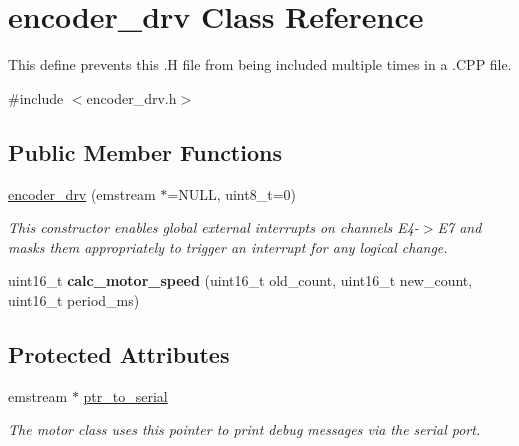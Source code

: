 \hypertarget{classencoder__drv}{\section{encoder\-\_\-drv Class Reference}
\label{classencoder__drv}
}


This define prevents this .H file from being included multiple times in a .C\-P\-P file.  




{\ttfamily \#include $<$encoder\-\_\-drv.\-h$>$}

\subsection*{Public Member Functions}
\begin{DoxyCompactItemize}
\item 
\hyperlink{classencoder__drv_a25af67f4725b47983ceb8ce4edf3296a}{encoder\-\_\-drv} (emstream $\ast$=N\-U\-L\-L, uint8\-\_\-t=0)
\begin{DoxyCompactList}\small\item\em This constructor enables global external interrupts on channels E4-\/$>$E7 and masks them appropriately to trigger an interrupt for any logical change. \end{DoxyCompactList}\item 
\hypertarget{classencoder__drv_affc7617f6c08f88b07454c58803f338d}{uint16\-\_\-t {\bfseries calc\-\_\-motor\-\_\-speed} (uint16\-\_\-t old\-\_\-count, uint16\-\_\-t new\-\_\-count, uint16\-\_\-t period\-\_\-ms)}\label{classencoder__drv_affc7617f6c08f88b07454c58803f338d}

\end{DoxyCompactItemize}
\subsection*{Protected Attributes}
\begin{DoxyCompactItemize}
\item 
\hypertarget{classencoder__drv_a9efa5138b331c06f0821b087168d2fda}{emstream $\ast$ \hyperlink{classencoder__drv_a9efa5138b331c06f0821b087168d2fda}{ptr\-\_\-to\-\_\-serial}}\label{classencoder__drv_a9efa5138b331c06f0821b087168d2fda}

\begin{DoxyCompactList}\small\item\em The motor class uses this pointer to print debug messages via the serial port. \end{DoxyCompactList}\end{DoxyCompactItemize}


